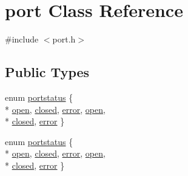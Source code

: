 \hypertarget{classport}{\section{port Class Reference}
\label{classport}
}


{\ttfamily \#include $<$port.\-h$>$}

\subsection*{Public Types}
\begin{DoxyCompactItemize}
\item 
enum \hyperlink{classport_a2f8ecb3d9778a986988296b474912ad3}{portstatus} \{ \\*
\hyperlink{group___uploader_gga2f8ecb3d9778a986988296b474912ad3afb5d8ee662534e6f325ce954a0c8c871}{open}, 
\hyperlink{group___uploader_gga2f8ecb3d9778a986988296b474912ad3a50e0bbb2e632ff3a0a8ca3d9e2a4d4c5}{closed}, 
\hyperlink{group___uploader_gga2f8ecb3d9778a986988296b474912ad3ad06a442e535c7c076194d8d25fdeffa4}{error}, 
\hyperlink{group___uploader_gga2f8ecb3d9778a986988296b474912ad3afb5d8ee662534e6f325ce954a0c8c871}{open}, 
\\*
\hyperlink{group___uploader_gga2f8ecb3d9778a986988296b474912ad3a50e0bbb2e632ff3a0a8ca3d9e2a4d4c5}{closed}, 
\hyperlink{group___uploader_gga2f8ecb3d9778a986988296b474912ad3ad06a442e535c7c076194d8d25fdeffa4}{error}
 \}
\item 
enum \hyperlink{group___uploader_ga2f8ecb3d9778a986988296b474912ad3}{portstatus} \{ \\*
\hyperlink{group___uploader_gga2f8ecb3d9778a986988296b474912ad3afb5d8ee662534e6f325ce954a0c8c871}{open}, 
\hyperlink{group___uploader_gga2f8ecb3d9778a986988296b474912ad3a50e0bbb2e632ff3a0a8ca3d9e2a4d4c5}{closed}, 
\hyperlink{group___uploader_gga2f8ecb3d9778a986988296b474912ad3ad06a442e535c7c076194d8d25fdeffa4}{error}, 
\hyperlink{group___uploader_gga2f8ecb3d9778a986988296b474912ad3afb5d8ee662534e6f325ce954a0c8c871}{open}, 
\\*
\hyperlink{group___uploader_gga2f8ecb3d9778a986988296b474912ad3a50e0bbb2e632ff3a0a8ca3d9e2a4d4c5}{closed}, 
\hyperlink{group___uploader_gga2f8ecb3d9778a986988296b474912ad3ad06a442e535c7c076194d8d25fdeffa4}{error}
 \}
\end{DoxyCompactItemize}

